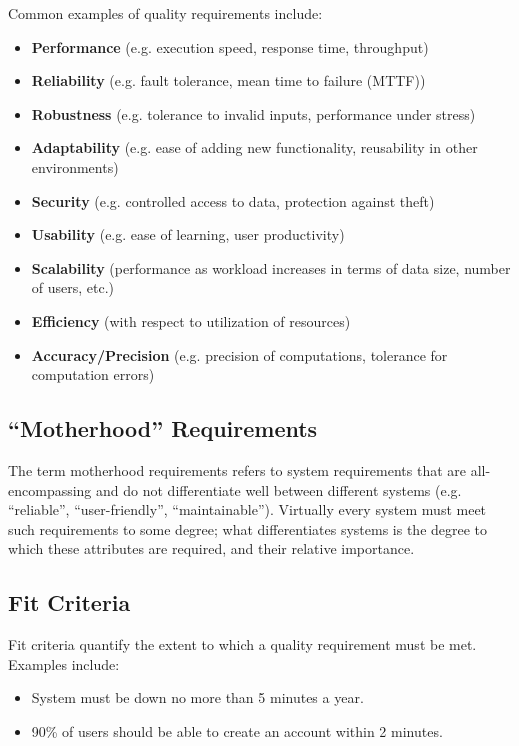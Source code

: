 \documentclass[12pt,titlepage]{article}
\begin{document}
    Common examples of quality requirements include:
    \begin{itemize}
      \item \textbf{Performance} (e.g. execution speed, response time, throughput)
      \item \textbf{Reliability} (e.g. fault tolerance, mean time to failure (MTTF))
      \item \textbf{Robustness} (e.g. tolerance to invalid inputs, performance under stress)
      \item \textbf{Adaptability} (e.g. ease of adding new functionality, reusability in other environments)
      \item \textbf{Security} (e.g. controlled access to data, protection against theft)
      \item \textbf{Usability} (e.g. ease of learning, user productivity)
      \item \textbf{Scalability} (performance as workload increases in terms of data size, number of users, etc.)
      \item \textbf{Efficiency} (with respect to utilization of resources)
      \item \textbf{Accuracy/Precision} (e.g. precision of computations, tolerance for computation errors)
    \end{itemize}

    \subsection{``Motherhood'' Requirements}
      The term motherhood requirements refers to system requirements that are all-encompassing and do not differentiate well between different systems
      (e.g. ``reliable'', ``user-friendly'', ``maintainable''). Virtually every system must meet such requirements to some degree; what differentiates
      systems is the degree to which these attributes are required, and their relative importance.

    \subsection{Fit Criteria}
      Fit criteria quantify the extent to which a quality requirement must be met. Examples include:
      \begin{itemize}
        \item System must be down no more than 5 minutes a year.
        \item 90\% of users should be able to create an account within 2 minutes.
      \end{itemize}
\end{document}
